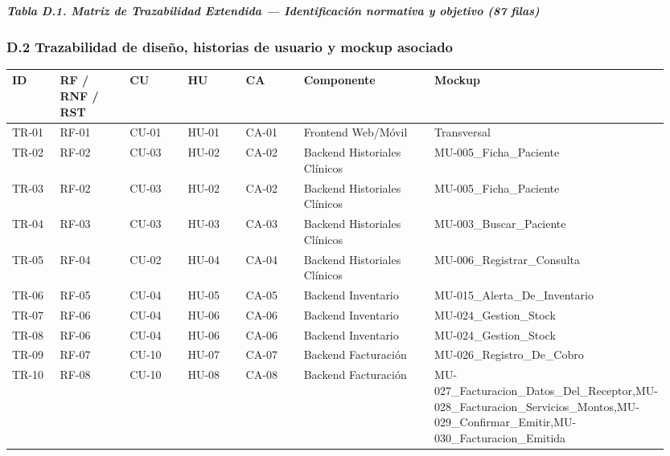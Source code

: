 \documentclass[
]{article}
\newcounter{none} %
\begin{document}
\protect{}\label{_bookmarkD1}{}\emph{\textbf{Tabla D.1. Matriz de Trazabilidad Extendida --- Identificación normativa y objetivo (87 filas)}}

\subsubsection{D.2 Trazabilidad de diseño, historias de usuario y mockup asociado}\label{d2-trazabilidad-diseno}

{\footnotesize
\def\LTcaptype{none}
\begin{longtable}[]{|
  >{\raggedright\arraybackslash}p{0.08\linewidth}|
  >{\raggedright\arraybackslash}p{0.12\linewidth}|
  >{\raggedright\arraybackslash}p{0.10\linewidth}|
  >{\raggedright\arraybackslash}p{0.10\linewidth}|
  >{\raggedright\arraybackslash}p{0.10\linewidth}|
  >{\raggedright\arraybackslash}p{0.22\linewidth}|
  >{\raggedright\arraybackslash}p{0.23\linewidth}|}
\hline
\textbf{ID} & \textbf{RF / RNF / RST} & \textbf{CU} & \textbf{HU} & \textbf{CA} & \textbf{Componente} & \textbf{Mockup} \\
\hline
\endhead
\hline
\endlastfoot
TR-01 & RF-01 & CU-01 & HU-01 & CA-01 & Frontend Web/Móvil & Transversal \\
\hline
TR-02 & RF-02 & CU-03 & HU-02 & CA-02 & Backend Historiales Clínicos & MU-005\_Ficha\_Paciente \\
\hline
TR-03 & RF-02 & CU-03 & HU-02 & CA-02 & Backend Historiales Clínicos & MU-005\_Ficha\_Paciente \\
\hline
TR-04 & RF-03 & CU-03 & HU-03 & CA-03 & Backend Historiales Clínicos & MU-003\_Buscar\_Paciente \\
\hline
TR-05 & RF-04 & CU-02 & HU-04 & CA-04 & Backend Historiales Clínicos & MU-006\_Registrar\_Consulta \\
\hline
TR-06 & RF-05 & CU-04 & HU-05 & CA-05 & Backend Inventario & MU-015\_Alerta\_De\_Inventario \\
\hline
TR-07 & RF-06 & CU-04 & HU-06 & CA-06 & Backend Inventario & MU-024\_Gestion\_Stock \\
\hline
TR-08 & RF-06 & CU-04 & HU-06 & CA-06 & Backend Inventario & MU-024\_Gestion\_Stock \\
\hline
TR-09 & RF-07 & CU-10 & HU-07 & CA-07 & Backend Facturación & MU-026\_Registro\_De\_Cobro \\
\hline
TR-10 & RF-08 & CU-10 & HU-08 & CA-08 & Backend Facturación & MU-027\_Facturacion\_Datos\_Del\_Receptor,MU-028\_Facturacion\_Servicios\_Montos,MU-029\_Confirmar\_Emitir,MU-030\_Facturacion\_Emitida \\

\end{longtable}}
\end{document}
